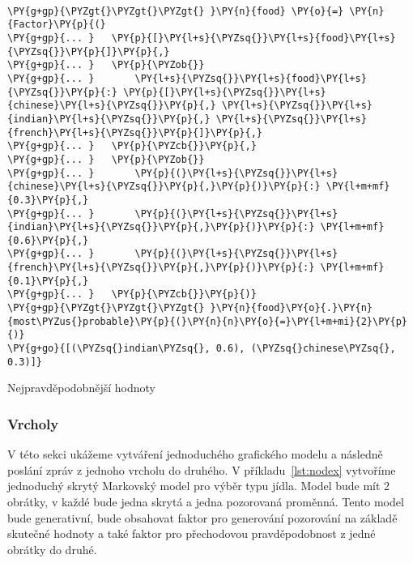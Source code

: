 \begin{example}
\begin{Verbatim}[commandchars=\\\{\}]

\PY{g+gp}{\PYZgt{}\PYZgt{}\PYZgt{} }\PY{n}{food} \PY{o}{=} \PY{n}{Factor}\PY{p}{(}
\PY{g+gp}{... }   \PY{p}{[}\PY{l+s}{\PYZsq{}}\PY{l+s}{food}\PY{l+s}{\PYZsq{}}\PY{p}{]}\PY{p}{,}
\PY{g+gp}{... }   \PY{p}{\PYZob{}}
\PY{g+gp}{... }       \PY{l+s}{\PYZsq{}}\PY{l+s}{food}\PY{l+s}{\PYZsq{}}\PY{p}{:} \PY{p}{[}\PY{l+s}{\PYZsq{}}\PY{l+s}{chinese}\PY{l+s}{\PYZsq{}}\PY{p}{,} \PY{l+s}{\PYZsq{}}\PY{l+s}{indian}\PY{l+s}{\PYZsq{}}\PY{p}{,} \PY{l+s}{\PYZsq{}}\PY{l+s}{french}\PY{l+s}{\PYZsq{}}\PY{p}{]}\PY{p}{,}
\PY{g+gp}{... }   \PY{p}{\PYZcb{}}\PY{p}{,}
\PY{g+gp}{... }   \PY{p}{\PYZob{}}
\PY{g+gp}{... }       \PY{p}{(}\PY{l+s}{\PYZsq{}}\PY{l+s}{chinese}\PY{l+s}{\PYZsq{}}\PY{p}{,}\PY{p}{)}\PY{p}{:} \PY{l+m+mf}{0.3}\PY{p}{,}
\PY{g+gp}{... }       \PY{p}{(}\PY{l+s}{\PYZsq{}}\PY{l+s}{indian}\PY{l+s}{\PYZsq{}}\PY{p}{,}\PY{p}{)}\PY{p}{:} \PY{l+m+mf}{0.6}\PY{p}{,}
\PY{g+gp}{... }       \PY{p}{(}\PY{l+s}{\PYZsq{}}\PY{l+s}{french}\PY{l+s}{\PYZsq{}}\PY{p}{,}\PY{p}{)}\PY{p}{:} \PY{l+m+mf}{0.1}\PY{p}{,}
\PY{g+gp}{... }   \PY{p}{\PYZcb{}}\PY{p}{)}
\PY{g+gp}{\PYZgt{}\PYZgt{}\PYZgt{} }\PY{n}{food}\PY{o}{.}\PY{n}{most\PYZus{}probable}\PY{p}{(}\PY{n}{n}\PY{o}{=}\PY{l+m+mi}{2}\PY{p}{)}
\PY{g+go}{[(\PYZsq{}indian\PYZsq{}, 0.6), (\PYZsq{}chinese\PYZsq{}, 0.3)]}
\end{Verbatim}
\caption{Nejpravděpodobnější hodnoty}
\label{lst:facmop}
\end{example}


\subsubsection{Vrcholy}

V této sekci ukážeme vytváření jednoduchého grafického modelu a následně poslání zpráv z jednoho vrcholu do druhého.
V příkladu~\ref{lst:nodex} vytvoříme jednoduchý skrytý Markovský model pro výběr typu jídla.
Model bude mít 2 obrátky, v každé bude jedna skrytá a jedna pozorovaná proměnná.
Tento model bude generativní, bude obsahovat faktor pro generování pozorování na základě skutečné hodnoty a také faktor pro přechodovou pravděpodobnost z jedné obrátky do druhé.

